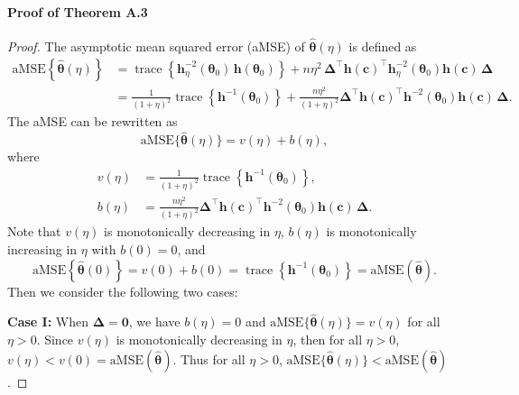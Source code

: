 \documentclass{article}
\theoremstyle{plain}
\theoremstyle{definition}
\theoremstyle{remark}
\begin{document}
\paragraph{Proof of Theorem A.3}
\begin{proof}
The asymptotic mean squared error (aMSE) of $\hat{\boldsymbol{\theta}}(\eta)$ is defined as
\begin{align*}
\mathrm{aMSE}\!\left\{\hat{\boldsymbol{\theta}}(\eta)\right\}
&= \operatorname{trace}\!\left\{
\boldsymbol{h}_\eta^{-2}(\boldsymbol{\theta}_0)\,\boldsymbol{h}(\boldsymbol{\theta}_0)
\right\}
+ n\eta^2\,\boldsymbol{\Delta}^\top
\boldsymbol{h}(\boldsymbol{c})^\top
\boldsymbol{h}_\eta^{-2}(\boldsymbol{\theta}_0)
\boldsymbol{h}(\boldsymbol{c})\,\boldsymbol{\Delta} \\
&= \frac{1}{(1+\eta)^2}\operatorname{trace}\!\left\{
\boldsymbol{h}^{-1}(\boldsymbol{\theta}_0)
\right\}
+ \frac{n\eta^2}{(1+\eta)^2}\boldsymbol{\Delta}^\top
\boldsymbol{h}(\boldsymbol{c})^\top
\boldsymbol{h}^{-2}(\boldsymbol{\theta}_0)
\boldsymbol{h}(\boldsymbol{c})\,\boldsymbol{\Delta}.
\end{align*} 
The aMSE can be rewritten as
\begin{equation*}
    \mathrm{aMSE}\{\hat{\boldsymbol{\theta}}(\eta)\}=v(\eta)+b(\eta),
\end{equation*}
where
\begin{align*}
v(\eta)
&= \frac{1}{(1+\eta)^2}\operatorname{trace}\!\left\{\boldsymbol{h}^{-1}(\boldsymbol{\theta}_0)\right\}, \\
b(\eta)
&= \frac{n\eta^2}{(1+\eta)^2}\boldsymbol{\Delta}^\top
\boldsymbol{h}(\boldsymbol{c})^\top
\boldsymbol{h}^{-2}(\boldsymbol{\theta}_0)
\boldsymbol{h}(\boldsymbol{c})\,\boldsymbol{\Delta}.
\end{align*}
Note that $v(\eta)$ is monotonically decreasing in $\eta$, $b(\eta)$ is monotonically increasing in $\eta$ with $b(0)=0$, and
\begin{equation*}
\mathrm{aMSE}\!\left\{\hat{\boldsymbol{\theta}}(0)\right\}
= v(0)+b(0)
= \operatorname{trace}\!\left\{\boldsymbol{h}^{-1}(\boldsymbol{\theta}_0)\right\}
= \mathrm{aMSE}\!\left(\hat{\boldsymbol{\theta}}\right).
\end{equation*}
Then we consider the following two cases:

\textbf{Case I:} When $\boldsymbol{\Delta}=\boldsymbol{0}$, we have $b(\eta)=0$ and $\mathrm{aMSE}\{\hat{\boldsymbol{\theta}}(\eta)\}=v(\eta)$ for all $\eta > 0$. Since $v(\eta)$ is monotonically decreasing in $\eta$, then for all $\eta > 0$, $v(\eta)< v(0)=\mathrm{aMSE}(\hat{\boldsymbol{\theta}})$. Thus for all $\eta>0$,
$\mathrm{aMSE}\{\hat{\boldsymbol{\theta}}(\eta)\}<\mathrm{aMSE}(\hat{\boldsymbol{\theta}})$. 


\end{proof}
\end{document}
